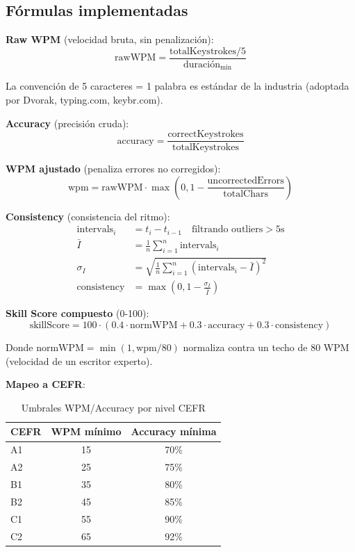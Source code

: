 \documentclass[10pt,a4paper,oneside]{report}
\begin{document}
\subsection{Fórmulas implementadas}

\textbf{Raw WPM} (velocidad bruta, sin penalización):
\begin{equation}
\text{rawWPM} = \frac{\text{totalKeystrokes} / 5}{\text{duración}_{\text{min}}}
\end{equation}

La convención de 5 caracteres = 1 palabra es estándar de la industria (adoptada por Dvorak, typing.com, keybr.com).

\textbf{Accuracy} (precisión cruda):
\begin{equation}
\text{accuracy} = \frac{\text{correctKeystrokes}}{\text{totalKeystrokes}}
\end{equation}

\textbf{WPM ajustado} (penaliza errores no corregidos):
\begin{equation}
\text{wpm} = \text{rawWPM} \cdot \max\left(0, 1 - \frac{\text{uncorrectedErrors}}{\text{totalChars}}\right)
\end{equation}

\textbf{Consistency} (consistencia del ritmo):
\begin{align}
\text{intervals}_i &= t_i - t_{i-1} \quad \text{filtrando outliers} > 5\text{s} \\
\bar{I} &= \frac{1}{n}\sum_{i=1}^{n} \text{intervals}_i \\
\sigma_I &= \sqrt{\frac{1}{n}\sum_{i=1}^{n} (\text{intervals}_i - \bar{I})^2} \\
\text{consistency} &= \max\left(0, 1 - \frac{\sigma_I}{\bar{I}}\right)
\end{align}

\textbf{Skill Score compuesto} (0-100):
\begin{equation}
\text{skillScore} = 100 \cdot \left(0.4 \cdot \text{normWPM} + 0.3 \cdot \text{accuracy} + 0.3 \cdot \text{consistency}\right)
\end{equation}

Donde $\text{normWPM} = \min(1, \text{wpm} / 80)$ normaliza contra un techo de 80 WPM (velocidad de un escritor experto).

\textbf{Mapeo a CEFR}:
\begin{table}[H]
\centering
\begin{tabular}{lcc}
\toprule
\textbf{CEFR} & \textbf{WPM mínimo} & \textbf{Accuracy mínima} \\
\midrule
A1 & 15 & 70\% \\
A2 & 25 & 75\% \\
B1 & 35 & 80\% \\
B2 & 45 & 85\% \\
C1 & 55 & 90\% \\
C2 & 65 & 92\% \\
\bottomrule
\end{tabular}
\caption{Umbrales WPM/Accuracy por nivel CEFR}
\end{table}
\end{document}
